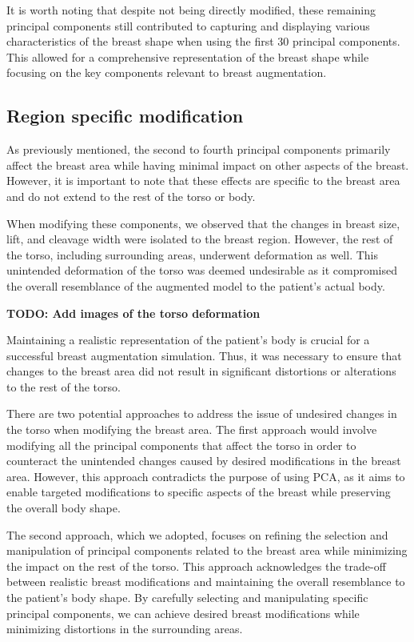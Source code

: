 It is worth noting that despite not being directly modified, these remaining principal components still contributed to capturing and displaying various characteristics of the breast 
shape when using the first 30 principal components. This allowed for a comprehensive representation of the breast shape while focusing on the key components relevant to breast augmentation.

\subsection{Region specific modification}

As previously mentioned, the second to fourth principal components primarily affect the breast area while having minimal impact on other aspects of the breast. 
However, it is important to note that these effects are specific to the breast area and do not extend to the rest of the torso or body.

When modifying these components, we observed that the changes in breast size, lift, and cleavage width were isolated to the breast region. 
However, the rest of the torso, including surrounding areas, underwent deformation as well. This unintended deformation of the torso was deemed undesirable as it compromised the overall 
resemblance of the augmented model to the patient's actual body.

\textbf{TODO: Add images of the torso deformation}

Maintaining a realistic representation of the patient's body is crucial for a successful breast augmentation simulation. Thus, it was necessary to ensure that changes to the breast 
area did not result in significant distortions or alterations to the rest of the torso.

There are two potential approaches to address the issue of undesired changes in the torso when modifying the breast area. The first approach would involve modifying all the 
principal components that affect the torso in order to counteract the unintended changes caused by desired modifications in the breast area. However, 
this approach contradicts the purpose of using PCA, as it aims to enable targeted modifications to specific aspects of the breast while preserving the overall body shape.

The second approach, which we adopted, focuses on refining the selection and manipulation of principal components related to the breast area while minimizing the impact on the rest of the torso. 
This approach acknowledges the trade-off between realistic breast modifications and maintaining the overall resemblance to the patient's body shape. By carefully selecting and manipulating 
specific principal components, we can achieve desired breast modifications while minimizing distortions in the surrounding areas.

